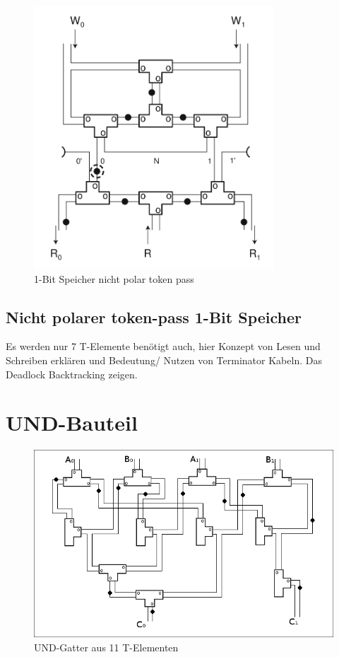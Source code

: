 \documentclass[11pt,a4paper]{article}
\begin{document}
\begin{figure}[h]
      \centering
      \includegraphics[width=9cm]{bilder/NonPolarMemory.png} 
      \caption{1-Bit Speicher nicht polar token pass}
\end{figure}

\subsection{Nicht polarer token-pass 1-Bit Speicher}
Es werden nur 7 T-Elemente benötigt auch, hier Konzept von Lesen und Schreiben
erklären und Bedeutung/ Nutzen von Terminator Kabeln.
Das Deadlock Backtracking zeigen.

\section{UND-Bauteil}

\begin{figure}[h]
    \centering
    \includegraphics[width=12cm]{bilder/UndGatter.png}
    \caption{UND-Gatter aus 11 T-Elementen}
\end{figure}    
\end{document}
